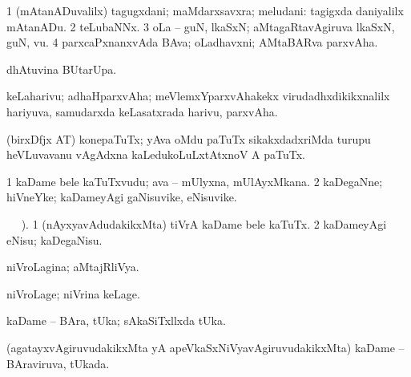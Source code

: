 {\bentry
{} 
\gl{\nA}
\expl{}
\bmng
\bnum
\num{1} (mAtanADuvalilx) tagugxdani; maMdarxsavxra; meludani:  tagigxda daniyalilx mAtanADu. 
\num{2} teLubaNNx. 
\num{3} oLa -- guN, lkaSxN; aMtagaRtavAgiruva lkaSxN, guN, \mo vu. 
\num{4} parxcaPxnanxvAda BAva; oLadhavxni; AMtaBARva parxvAha. 
\enum
\emng
\eentry

\bentry
{} 
\gl{\sakirx}
\expl{}
\bmng
  dhAtuvina BUtarUpa. 
\emng
\eentry

\bentry
{} 
\gl{\nA}
\expl{}
\bmng
 keLaharivu; adhaHparxvAha; meVlemxYparxvAhakekx virudadhxdikikxnalilx hariyuva, samudarxda keLasatxrada harivu, parxvAha. 
\emng
\eentry

\bentry
{} 
\gl{\nA}
\expl{}
\bmng
 (birxDfjx AT) konepaTuTx; yAva oMdu paTuTx sikakxdadxriMda turupu heVLuvavanu vAgAdxna kaLedukoLuLxtAtxnoV A paTuTx. 
\emng
\eentry

\bentry
{} 
\gl{\nA}
\expl{}
\bmng
\bnum
\num{1} kaDame bele kaTuTxvudu; ava -- mUlyxna, mUlAyxMkana. 
\num{2} kaDegaNne; hiVneYke; kaDameyAgi gaNisuvike, eNisuvike. 
\enum
\emng
\eentry

\bentry
{} 
\gl{\sakirx}
\BUkaq\  \vakaq\ ). \bmng
\bnum
\num{1} (nAyxyavAdudakikxMta) tiVrA kaDame bele kaTuTx. 
\num{2} kaDameyAgi eNisu; kaDegaNisu. 
\enum
\emng
\eentry

\bentry
{} 
\gl{\nA}
\expl{}
\bmng
\emng
\eentry

\bentry
{} 
\gl{\gu}
\expl{}
\bmng
 niVroLagina; aMtajRliVya. 
\emng
\eentry

\bentry
{} 
\gl{\kirxvi}
\expl{}
\bmng
 niVroLage; niVrina keLage. 
\emng
\eentry

\bentry
{} 
\gl{\nA}
\expl{}
\bmng
\emng
\eentry

\bentry
{} 
\gl{\nA}
\expl{}
\bmng
 kaDame -- BAra, tUka; sAkaSiTxllxda tUka. 
\emng
\eentry

\bentry
{} 
\gl{\gu}
\expl{}
\bmng
 (agatayxvAgiruvudakikxMta yA apeVkaSxNiVyavAgiruvudakikxMta) kaDame -- BAraviruva, tUkada. 
\emng
\eentry

}
